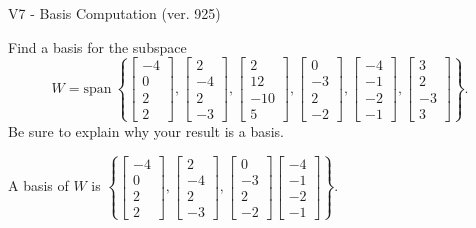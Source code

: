 \begin{exercise}
  \begin{exerciseTitle}V7 - Basis Computation (ver. 925)\end{exerciseTitle}
  \begin{exerciseStatement}
    Find a basis for the subspace 
\[W=\mathrm{span}\ \left\{\left[\begin{array}{r}
-4 \\
0 \\
2 \\
2
\end{array}\right] , \left[\begin{array}{r}
2 \\
-4 \\
2 \\
-3
\end{array}\right] , \left[\begin{array}{r}
2 \\
12 \\
-10 \\
5
\end{array}\right] , \left[\begin{array}{r}
0 \\
-3 \\
2 \\
-2
\end{array}\right] , \left[\begin{array}{r}
-4 \\
-1 \\
-2 \\
-1
\end{array}\right] , \left[\begin{array}{r}
3 \\
2 \\
-3 \\
3
\end{array}\right]\right\}.\]
 Be sure to explain why your result is a basis.


  \end{exerciseStatement}
  \begin{exerciseAnswer}
   A basis of \(W\) is  \(\left\{\left[\begin{array}{r}
-4 \\
0 \\
2 \\
2
\end{array}\right] , \left[\begin{array}{r}
2 \\
-4 \\
2 \\
-3
\end{array}\right] , \left[\begin{array}{r}
0 \\
-3 \\
2 \\
-2
\end{array}\right] \left[\begin{array}{r}
-4 \\
-1 \\
-2 \\
-1
\end{array}\right]\right\}\).
  


  \end{exerciseAnswer}
\end{exercise}